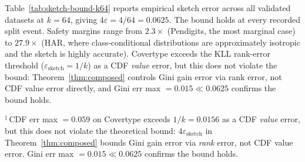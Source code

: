 \documentclass{article}
\begin{document}
Table~\ref{tab:sketch-bound-k64} reports empirical sketch error across all
validated datasets at $k{=}64$, giving $4\varepsilon = 4/64 = 0.0625$.
The bound holds at every recorded split event. Safety margins range from
$2.3\times$ (Pendigits, the most marginal case) to $27.9\times$ (HAR, where
class-conditional distributions are approximately isotropic and the sketch
is highly accurate). Covertype exceeds the KLL rank-error threshold
($\varepsilon_{\mathrm{sketch}} = 1/k$) as a CDF \emph{value} error, but
this does not violate the bound: Theorem~\ref{thm:composed} controls Gini
gain error via rank error, not CDF value error directly, and
Gini err max $= 0.015 \ll 0.0625$ confirms the bound holds.

\begin{table}[h]
\centering
\caption{Empirical sketch error at $k{=}64$ ($4\varepsilon = 0.0625$).
         \emph{Events}: split decisions recorded (5 seeds, $\times$5).
         \emph{Ratio}: $4\varepsilon \,/\,$ Gini err max (worst-case
         safety margin).
         Letter is excluded; see note below.}
\label{tab:sketch-bound-k64}
\smallskip
\begin{minipage}{\linewidth}
\small
$^\ddagger$\,CDF err max $= 0.059$ on Covertype exceeds $1/k = 0.0156$
as a CDF \emph{value} error, but this does not violate the theoretical
bound: $4\varepsilon_{\mathrm{sketch}}$ in Theorem~\ref{thm:composed}
bounds Gini gain error via \emph{rank} error, not CDF value error.
Gini err max $= 0.015 \ll 0.0625$ confirms the bound holds.
\end{minipage}
\end{table}
\end{document}
